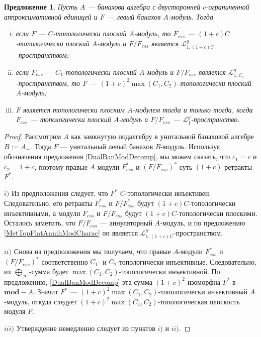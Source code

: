 \documentclass[12pt]{article}
\newtheorem{proposition}[theorem]{Предложение}
\begin{document}
\begin{proposition}\label{TopFlatModCharac} Пусть $A$ --- банахова алгебра с двусторонней $c$-ограниченной аппроксимативной единицей и $F$ --- левый банахов $A$-модуль. Тогда
\begin{enumerate}[i)]
\item если $F$ --- $C$-топологически плоский $A$-модуль, то $F_{ess}$ --- $(1+c)C$-топологически плоский $A$-модуль и $F/F_{ess}$ является $\mathcal{L}_{1,(1+c)C}^g$-пространством;
\item если $F_{ess}$ --- $C_1$-топологически плоский $A$-модуль и $F/F_{ess}$ является $\mathcal{L}_{1,C_1}^g$-пространством, то $F$ --- $(1+c)^2\max(C_1, C_2)$-топологически плоский $A$-модуль;
\item $F$ является топологически плоским $A$-модулем тогда и только тогда, когда $F_{ess}$  --- топологически плоский $A$-модуль и $F/F_{ess}$ --- $\mathcal{L}_1^g$-пространство.
\end{enumerate}
\end{proposition}
\begin{proof} Рассмотрим $A$ как замкнутую подалгебру в унитальной банаховой алгебре $B:=A_+$. Тогда $F$ --- унитальный левый банахов $B$-модуль. Используя обозначения предложения \ref{DualBanModDecomp}, мы можем сказать, что $c_1=c$ и $c_2=1+c$, поэтому правые $A$-модули $F_{ess}^*$ и $(F/F_{ess})^*$ суть $(1+c)$-ретракты $F^*$.

$i)$ Из предположения следует, что $F^*$ $C$-топологически инъективен. Следовательно, его ретракты $F_{ess}^*$ и $F/F_{ess}^*$ будут $(1+c)C$-топологически инъективными, а модули $F_{ess}$ и $F/F_{ess}$ будут $(1+c)C$-топологически плоскими. Осталось заметить, что $F/F_{ess}$ --- аннуляторный $A$-модуль, и по предложению \ref{MetTopFlatAnnihModCharac} он является $\mathcal{L}_{1,(1+c)C}^g$-пространством.

$ii)$ Снова из предположения мы получаем, что правые $A$-модули $F_{ess}^*$ и $(F/F_{ess})^*$ соответственно $C_1$- и $C_2$-топологически инъективные. Следовательно, их $\bigoplus_\infty$-сумма будет $\max(C_1,C_2)$-топологически инъективной. По предложению, \ref{DualBanModDecomp} эта сумма $(1+c)^2$-изоморфна $F^*$ в $\mathbf{mod}-A$. Значит $F^*$ ---  $(1+c)^2\max(C_1, C_2)$-топологически инъективный $A$-модуль, откуда следует $(1+c)^2\max(C_1, C_2)$-топологическая плоскость модуля $F$.

$iii)$ Утверждение немедленно следует из пунктов $i)$ и $ii)$.
\end{proof}
\end{document}
